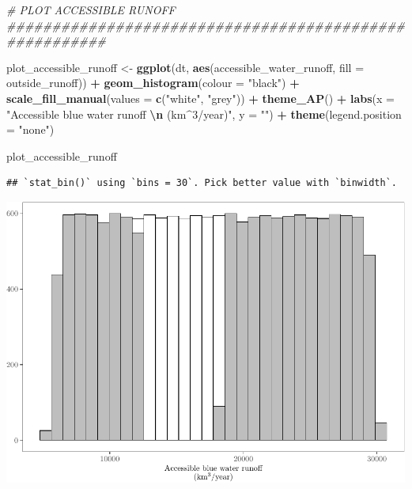 \documentclass[
  11pt,
]{article}
\newenvironment{Shaded}{\begin{snugshade}}{\end{snugshade}}
\newcommand{\AttributeTok}[1]{\textcolor[rgb]{0.13,0.29,0.53}{#1}}
\newcommand{\CommentTok}[1]{\textcolor[rgb]{0.56,0.35,0.01}{\textit{#1}}}
\newcommand{\FunctionTok}[1]{\textcolor[rgb]{0.13,0.29,0.53}{\textbf{#1}}}
\newcommand{\NormalTok}[1]{#1}
\newcommand{\OtherTok}[1]{\textcolor[rgb]{0.56,0.35,0.01}{#1}}
\newcommand{\SpecialCharTok}[1]{\textcolor[rgb]{0.81,0.36,0.00}{\textbf{#1}}}
\newcommand{\StringTok}[1]{\textcolor[rgb]{0.31,0.60,0.02}{#1}}
\begin{document}
\begin{Shaded}
\begin{Highlighting}[]
\CommentTok{\# PLOT ACCESSIBLE RUNOFF \#\#\#\#\#\#\#\#\#\#\#\#\#\#\#\#\#\#\#\#\#\#\#\#\#\#\#\#\#\#\#\#\#\#\#\#\#\#\#\#\#\#\#\#\#\#\#\#\#\#\#\#\#\#\#}

\NormalTok{plot\_accessible\_runoff }\OtherTok{\textless{}{-}} \FunctionTok{ggplot}\NormalTok{(dt, }\FunctionTok{aes}\NormalTok{(accessible\_water\_runoff, }\AttributeTok{fill =}\NormalTok{ outside\_runoff)) }\SpecialCharTok{+}
  \FunctionTok{geom\_histogram}\NormalTok{(}\AttributeTok{colour =} \StringTok{"black"}\NormalTok{) }\SpecialCharTok{+}
  \FunctionTok{scale\_fill\_manual}\NormalTok{(}\AttributeTok{values =} \FunctionTok{c}\NormalTok{(}\StringTok{"white"}\NormalTok{, }\StringTok{"grey"}\NormalTok{)) }\SpecialCharTok{+}
  \FunctionTok{theme\_AP}\NormalTok{() }\SpecialCharTok{+} 
  \FunctionTok{labs}\NormalTok{(}\AttributeTok{x =} \StringTok{"Accessible blue water runoff }\SpecialCharTok{\textbackslash{}n}\StringTok{ (km$\^{}3$/year)"}\NormalTok{, }\AttributeTok{y =} \StringTok{""}\NormalTok{) }\SpecialCharTok{+}
  \FunctionTok{theme}\NormalTok{(}\AttributeTok{legend.position =} \StringTok{"none"}\NormalTok{)}

\NormalTok{plot\_accessible\_runoff}
\end{Highlighting}
\end{Shaded}

\begin{verbatim}
## `stat_bin()` using `bins = 30`. Pick better value with `binwidth`.
\end{verbatim}

\includegraphics{code_fallacies_water_crisis_files/figure-latex/rest-2.pdf}
\end{document}
